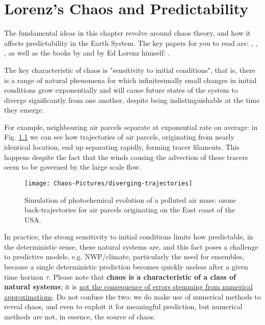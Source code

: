 \chapter{Lorenz's Chaos and Predictability}

The fundamental ideas in this chapter revolve around chaos theory, and how it affects predictability in the Earth System.
The key papers for you to read are: \cite{lorenz:63}, \cite{lorenz:69}, \cite{Vallis:86}, as well as the books by \cite{Gleick-book} and by Ed Lorenz himself: \cite{Lorenz-book}.

\begin{definition}
The key characteristic of chaos is "sensitivity to initial conditions", that is, there is a range of natural phenomena for which infinitesimally small changes in initial conditions grow exponentially and will cause future states of the system to diverge significantly from one another, despite being indistinguishable at the time they emerge.
\end{definition}

For example, neighbouring air parcels separate at exponential rate on average: in Fig. \ref{fig:diverging-trajectories} we can see how trajectories of air parcels, originating from nearly identical location, end up separating rapidly, forming tracer filaments. This happens despite the fact that the winds causing the advection of these tracers seem to be governed by the large scale flow.

\begin{figure}[h!]
	\texttt{[image: Chaos-Pictures/diverging-trajectories]}
	\caption{Simulation of photochemical evolution of a polluted air mass: ozone back-trajectories for air parcels originating on the East coast of the USA.}
	\label{fig:diverging-trajectories}
\end{figure}

In practice, the strong sensitivity to initial conditions limits how predictable, in the deterministic sense, these natural systems are, and this fact poses a challenge to predictive models, e.g. NWP/climate, particularly the need for ensembles, because a single deterministic prediction becomes quickly useless after a given time horizon $\tau$. Please note that {\bf chaos is a characteristic of a class of natural systems}; it is \underline{not the consequence of errors stemming from numerical approximations}. Do not confuse the two: we do make use of numerical methods to reveal chaos, and even to exploit it for meaningful prediction, but numerical methods are not, in essence, the source of chaos.


